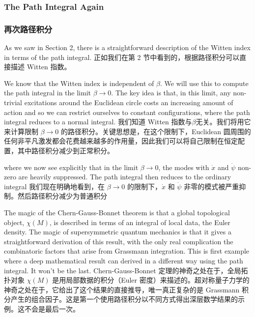 \documentclass{article}
\begin{document}
\begin{paracol}{2}
\subsubsection{The Path Integral Again}
\switchcolumn
\subsubsection*{再次路径积分}
\switchcolumn*

As we saw in Section 2, there is a straightforward description of the Witten index in terms of the path integral.
\switchcolumn
正如我们在第 2 节中看到的，根据路径积分可以直接描述 Witten 指数。
\switchcolumn*

We know that the Witten index is independent of $\beta$. We will use this to compute the path integral in the limit $\beta \to 0$. The key idea is that, in this limit, any non-trivial excitations around the Euclidean circle costs an increasing amount of action and so we can restrict ourselves to constant conﬁgurations, where the path integral reduces to a normal integral.
\switchcolumn
我们知道 Witten 指数与$\beta$无关。我们将用它来计算限制 $\beta \to 0$ 的路径积分。关键思想是，在这个限制下，Euclidean 圆周围的任何非平凡激发都会花费越来越多的作用量，因此我们可以将自己限制在恒定配置，其中路径积分减少到正常积分。
\switchcolumn*

where we now see explicitly that in the limit $\beta \to 0$, the modes with $\dot{x}$ and $\dot{\psi}$ non-zero are heavily suppressed. The path integral then reduces to the ordinary integral
\switchcolumn
我们现在明确地看到，在 $\beta \to 0$ 的限制下，$\dot{x}$ 和 $\dot{\psi}$ 非零的模式被严重抑制。然后路径积分减少为普通积分
\switchcolumn*

The magic of the Chern-Gauss-Bonnet theorem is that a global topological object, $\chi(M)$, is described in terms of an integral of local data, the Euler density. The magic of supersymmetric quantum mechanics is that it gives a straightforward derivation of this result, with the only real complication the combinatoric factors that arise from Grassmann integration. This is ﬁrst example where a deep mathematical result can derived in a diﬀerent way using the path integral. It won’t be the last.
\switchcolumn
Chern-Gauss-Bonnet 定理的神奇之处在于，全局拓扑对象 $\chi(M)$ 是用局部数据的积分（Euler 密度）来描述的。超对称量子力学的神奇之处在于，它给出了这个结果的直接推导，唯一真正复杂的是 Grassmann 积分产生的组合因子。这是第一个使用路径积分以不同方式得出深层数学结果的示例。这不会是最后一次。
\switchcolumn*


\end{paracol}
\end{document}
